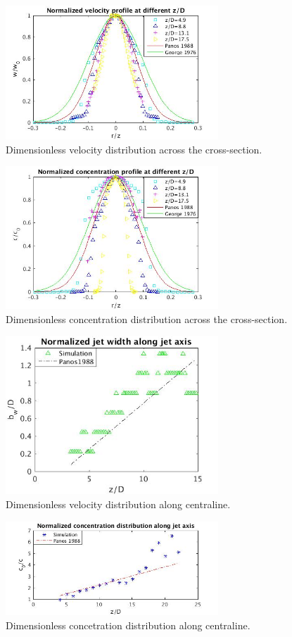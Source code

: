 \documentclass[journal abbreviation, manuscript]{copernicus}
\begin{document}
\begin{figure}
\includegraphics[width=8cm]{vel_cross}
\caption{Dimensionless velocity distribution across the cross-section.}
\label{fig:JPUE_cross-section_vel}
\end{figure}
\begin{figure}
\includegraphics[width=8cm]{conc_cross}
\caption{Dimensionless concentration distribution across the cross-section.}
\label{fig:JPUE_cross-section_conc}
\end{figure}

\begin{figure}
\includegraphics[width=8cm]{velo_along_axis}
\caption{Dimensionless velocity distribution along centraline.}
\label{fig:JPUE_along-axis_vel}
\end{figure}
\begin{figure}
\includegraphics[width=8cm]{conc_along_axis}
\caption{Dimensionless concetration distribution along centraline.}
\label{fig:JPUE_along-axis_conc}
\end{figure}
\end{document}
